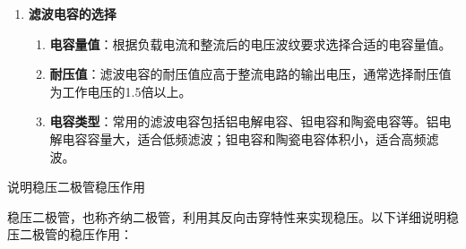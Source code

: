 \documentclass[dvipsnames, svgnames,a4paper,11pt]{article}
\begin{document}
\begin{enumerate}
			\item \textbf{滤波电容的选择}
				\begin{enumerate}
					\item \textbf{电容量值}：根据负载电流和整流后的电压波纹要求选择合适的电容量值。
					\item \textbf{耐压值}：滤波电容的耐压值应高于整流电路的输出电压，通常选择耐压值为工作电压的1.5倍以上。
					\item \textbf{电容类型}：常用的滤波电容包括铝电解电容、钽电容和陶瓷电容等。铝电解电容容量大，适合低频滤波；钽电容和陶瓷电容体积小，适合高频滤波。
				\end{enumerate}
		\end{enumerate}



	\begin{question}
		说明稳压二极管稳压作用
	\end{question}

		稳压二极管，也称齐纳二极管，利用其反向击穿特性来实现稳压。以下详细说明稳压二极管的稳压作用：
\end{document}
